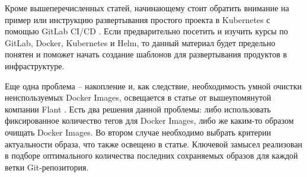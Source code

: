 Кроме вышеперечисленных статей, начинающему стоит обратить внимание на пример или инструкцию развертывания простого проекта в Kubernetes с помощью GitLab CI/CD \cite{habr:flant:k8s-helm-gitlab-sample}. Если предварительно посетить и изучить курсы по GitLab, Docker, Kubernetes и Helm, то данный материал будет предельно понятен и поможет начать создание шаблонов для развертывания продуктов в инфраструктуре.

Еще одна проблема -- накопление и, как следствие, необходимость умной очистки неиспользуемых Docker Images, освещается в статье от вышеупомянутой компании Flant \cite{habr:flant:docker-stackoverflow}. Есть два решения данной проблемы: либо использовать фиксированное количество тегов для Docker Images, либо же каким-то образом очищать Docker Images. Во втором случае необходимо выбрать критерии актуальности образа, что также освещено в статье. Ключевой замысел реализован в подборе оптимального количества последних сохраняемых образов для каждой ветки Git-репозитория.
